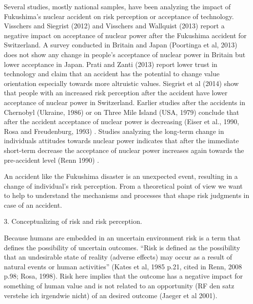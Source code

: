 Several studies, mostly national samples, have been analyzing the impact of Fukushima's nuclear accident on risk perception or acceptance of technology. Visschers and Siegrist (2012) and Visschers and Wallquist (2013) \citep{Visschers:2012bf,Visschers:2013ee}  report a negative impact on acceptance of nuclear power after the Fukushima accident for Switzerland. A survey conducted in Britain and Japan (Poortinga et al, 2013) \citep{Poortinga:2013gt} does not show any change in people's acceptance of nuclear power in Britain but lower acceptance in Japan. Prati and Zanti (2013) \citep{Prati:2013jc} report lower trust in technology and claim that an accident has the potential to change value orientation especially towards more altruistic values.
Siegrist et al (2014) \citep{Siegrist:2014ji} show that people with an increased risk perception after the accident have lower acceptance of nuclear power in Switzerland. 
Earlier studies after the accidents in Chernobyl (Ukraine, 1986) or on Three Mile Island (USA, 1979) conclude that after the accident acceptance of nuclear power is decreasing (Eiser et al., 1990, Rosa and Freudenburg, 1993) \citep{RichardEiser:1990iw, Rosa:1993uj}. Studies analyzing the long-term change in individuals attitudes towards nuclear power indicates that after the immediate short-term decrease the acceptance of nuclear power increases again towards the pre-accident level (Renn 1990) \citep{Renn:1990kf}.  


An accident like the Fukushima disaster is an unexpected event, resulting in a change of individual's risk perception. From a theoretical point of view we want to help to understand the mechanisms and processes that shape risk judgments in case of an accident. 



                                                       

 
3. Conceptualizing of risk and risk perception. 

Because  humans are embedded in an uncertain environment risk is a term that defines the possibility of  uncertain outcomes.  ``Risk is defined as the possibility that an undesirable state of reality (adverse effects) may occur as a result of natural events or human activities'' (Kates et al, 1985 p.21, cited in Renn, 2008 p.98; Rosa, 1998). Risk here implies that the outcome has a negative impact for something of human value and is not related to an opportunity (RF den satz verstehe ich irgendwie nicht) of an desired outcome (Jaeger et al 2001).

